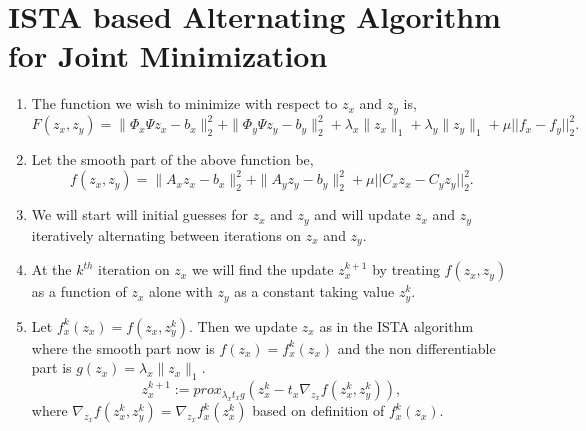 \section{ISTA based Alternating Algorithm for Joint Minimization}
\label{sec:alt}
\begin{enumerate}
\item The function we wish to minimize with respect to $z_x$ and $z_y$ is,
 \begin{equation}
 F(z_x, z_y) = \|\Phi_x\Psi z_x - b_x\|_2^2 + \|\Phi_y\Psi z_y - b_y\|_2^2 + \lambda_x \|z_x\|_1 + \lambda_y \|z_y\|_1 + \mu ||f_x - f_y||_2^2.
 \end{equation}
\item Let the smooth part of the above function be,
\begin{equation}
 f(z_x, z_y) = \|A_x z_x - b_x\|_2^2 + \|A_y z_y - b_y\|_2^2  + \mu ||C_x z_x - C_y z_y||_2^2. 
\end{equation}
\item We will start will initial guesses for $z_x$ and $z_y$ and will update $z_x$ and $z_y$ iteratively alternating between iterations on $z_x$ and $z_y$.
\item At the $k^{th}$ iteration on $z_x$ we will find the update $z_x^{k+1}$ by treating $f(z_x, z_y)$ as a function of $z_x$ alone with $z_y$ as a constant taking value $z_y^{k}$. 
\item Let $f^k_x(z_x) = f(z_x, z_y^{k})$. Then we update $z_x$ as in the ISTA algorithm where the smooth part now is $f(z_x) = f^k_x(z_x)$ and the non differentiable part is $g(z_x) = \lambda_x \|z_x\|_1$.
\begin{equation}
	   z_x^{k+1} := prox_{\lambda_xt_xg} \left( z_x^k - t_x \nabla_{z_x} f(z_x^k, z_y^k) \right),
\end{equation}
where $\nabla_{z_x} f(z_x^k, z_y^k) = \nabla_{z_x} f_x^k(z_x^k)$ based on definition of $f_x^k(z_x)$.
	   

\end{enumerate}
